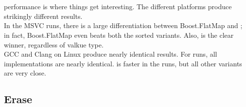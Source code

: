 \\
\\


 performance is where things get interesting.  The different
platforms produce strikingly different results.\\

In the MSVC runs, there is a large differentiation between Boost.FlatMap and
; in fact, Boost.FlatMap even beats both the sorted 
variants.  Also,  is the clear winner, regardless of
valkue type.\\

GCC and Clang on Linux produce nearly identical results.  For  runs, all implementations are nearly identical.  
is faster in the  runs, but all other
variants are very close.

\subsection{Erase}

